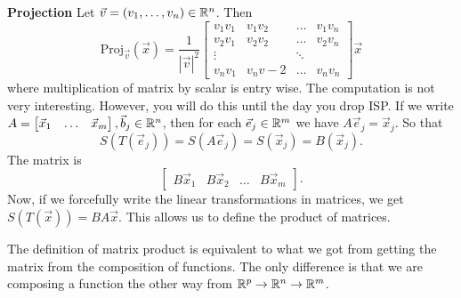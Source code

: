 \textbf{Projection} Let $\vec{v}=(v_1,\ldots,v_n)\in\mathbb{R}^n$. Then \[
	\textrm{Proj}_{\vec{v}}(\vec{x})=\frac{1}{|\vec{v}|^2}\begin{bmatrix}
		v_1 v_1 & v_1 v_2 & \ldots & v_1 v_n \\
		v_2 v_1 & v_2 v_2 & \ldots & v_2 v_n \\
		\vdots & & \ddots & \\
		v_n v_1 & v_n v-2 & \ldots & v_n v_n
	\end{bmatrix}\vec{x}
\]
where multiplication of matrix by scalar is entry wise.
The computation is not very interesting. However, you will do this until the day you drop ISP.
If we write $A=\begin{bmatrix}
	\vec{x}_1 & \ldots & \vec{x}_m
\end{bmatrix}, \vec{b}_j\in\mathbb{R}^n$, then for each $\vec{e}_j\in\mathbb{R}^m$ we have $A\vec{e}_j=\vec{x}_j$.
So that \[
S(T(\vec{e}_j))= S(A\vec{e}_j) = S(\vec{x}_j) = B(\vec{x}_j).
\]
The matrix is \[
\begin{bmatrix}
	B\vec{x}_1 & B\vec{x}_2 & \ldots & B\vec{x}_m
\end{bmatrix}.
\]
Now, if we forcefully write the linear transformations in matrices, we get $S(T(\vec{x}))= BA\vec{x}$. This allows us
to define the product of matrices.
\begin{remark}
	The definition of matrix product is equivalent to what we got from getting the matrix from the composition of functions.
	The only difference is that we are composing a function the other way from $\mathbb{R}^p\to\mathbb{R}^n\to\mathbb{R}^m$.
\end{remark}
